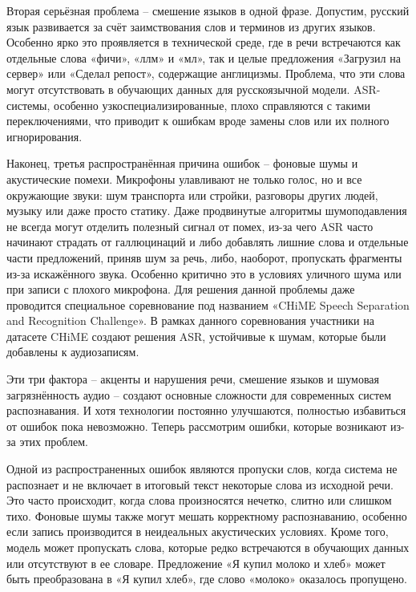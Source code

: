 Вторая серьёзная проблема -- смешение языков в одной фразе.%
Допустим, русский язык развивается за счёт заимствования слов и терминов из других языков.
Особенно ярко это проявляется в технической среде, где в речи встречаются как отдельные слова «фичи», «ллм» и «мл», так и целые предложения «Загрузил на сервер» или «Сделал репост», содержащие англицизмы.
Проблема, что эти слова могут отсутствовать в обучающих данных для русскоязычной модели.
ASR-системы, особенно узкоспециализированные, плохо справляются с такими переключениями, что приводит к ошибкам вроде замены слов или их полного игнорирования.

Наконец, третья распространённая причина ошибок -- фоновые шумы и акустические помехи\cite{hansen1996analysis}.
Микрофоны улавливают не только голос, но и все окружающие звуки: шум транспорта или стройки, разговоры других людей, музыку или даже просто статику.
Даже продвинутые алгоритмы шумоподавления не всегда могут отделить полезный сигнал от помех, из-за чего ASR часто начинают страдать от галлюцинаций и либо добавлять лишние слова и отдельные части предложений, приняв шум за речь, либо, наоборот, пропускать фрагменты из-за искажённого звука.
Особенно критично это в условиях уличного шума или при записи с плохого микрофона.
Для решения данной проблемы даже проводится специальное соревнование под названием «CHiME Speech Separation and Recognition Challenge»\cite{watanabe2020chime}.
В рамках данного соревнования участники на датасете CHiME создают решения ASR, устойчивые к шумам, которые были добавлены к аудиозаписям.

Эти три фактора -- акценты и нарушения речи, смешение языков и шумовая загрязнённость аудио -- создают основные сложности для современных систем распознавания.
И хотя технологии постоянно улучшаются, полностью избавиться от ошибок пока невозможно\cite{dua2023noise, chen2023hyporadise, hu2024large, yang2024large}.
Теперь рассмотрим ошибки, которые возникают из-за этих проблем.

Одной из распространенных ошибок являются пропуски слов, когда система не распознает и не включает в итоговый текст некоторые слова из исходной речи.
Это часто происходит, когда слова произносятся нечетко, слитно или слишком тихо.
Фоновые шумы также могут мешать корректному распознаванию, особенно если запись производится в неидеальных акустических условиях.
Кроме того, модель может пропускать слова, которые редко встречаются в обучающих данных или отсутствуют в ее словаре.
Предложение «Я купил молоко и хлеб» может быть преобразована в «Я купил хлеб», где слово «молоко» оказалось пропущено.

